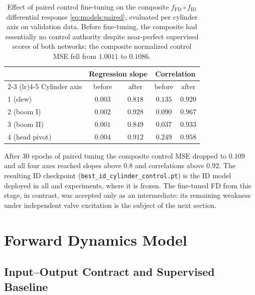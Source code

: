 \begin{table}[tb]
  \centering
  \caption{Effect of paired control fine-tuning on the composite
  $f_{\mathrm{FD}} \circ f_{\mathrm{ID}}$ differential response
  \eqref{eq:models:paired}, evaluated per cylinder axis on validation data.
  Before fine-tuning, the composite had essentially no control authority
  despite near-perfect supervised scores of both networks; the composite
  normalized control MSE fell from $1.0011$ to $0.1086$.}
  \label{tab:models:paired}
  \begin{tabular}{lcccc}
    \toprule
    & \multicolumn{2}{c}{Regression slope}
    & \multicolumn{2}{c}{Correlation} \\
    \cmidrule(lr){2-3} \cmidrule(lr){4-5}
    Cylinder axis & before & after & before & after \\
    \midrule
    1 (slew)      & $0.003$ & $0.818$ & $0.135$ & $0.920$ \\
    2 (boom I)    & $0.002$ & $0.928$ & $0.090$ & $0.967$ \\
    3 (boom II)   & $0.001$ & $0.849$ & $0.037$ & $0.933$ \\
    4 (head pivot)& $0.004$ & $0.912$ & $0.249$ & $0.958$ \\
    \bottomrule
  \end{tabular}
\end{table}

After 30 epochs of paired tuning the composite control MSE dropped to
$0.109$ and all four axes reached slopes above $0.8$ and correlations above
$0.92$. The resulting ID checkpoint
(\texttt{best\_id\_cylinder\_control.pt}) is the ID model deployed in all
\ppoIDFD{} and \ppoIDAAMFD{} experiments, where it is frozen. The fine-tuned FD from this stage, in contrast, was
accepted only as an intermediate: its remaining weakness under independent valve excitation is the subject of the next section.

\section{Forward Dynamics Model}
\label{sec:models:fd}

\subsection{Input--Output Contract and Supervised Baseline}

